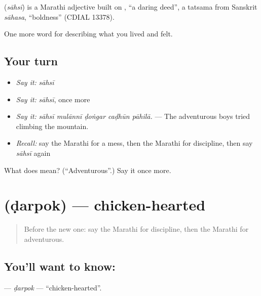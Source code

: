 \begin{cousinweb}
\textbf{} (\emph{sāhsī}) is a Marathi adjective built on , \textquotedblleft{}a daring deed\textquotedblright{}, a tatsama from Sanskrit \emph{sāhasa}, \textquotedblleft{}boldness\textquotedblright{} (CDIAL 13378).
\end{cousinweb}

\begin{grammarlens}[title={What you've built}]
One more word for describing what you lived and felt.
\end{grammarlens}

\subsection*{Your turn}
\begin{itemize}
\raggedright
  \item \emph{Say it:} \emph{sāhsī}
  \item \emph{Say it:} \emph{sāhsī}, once more
  \item \emph{Say it:} \emph{sāhsī mulānnī ḍoṅgar caḍhūn pāhilā.} — The adventurous boys tried climbing the mountain.
  \item \emph{Recall:} say the Marathi for a mess, then the Marathi for discipline, then say \emph{sāhsī} again
\end{itemize}

\begin{tcolorbox}[breakable,colback=teal!4,colframe=teal!35!black,title={Before you move on}]
What does  mean? (\textquotedblleft{}Adventurous\textquotedblright{}.) Say it once more.
\end{tcolorbox}
\section[\texorpdfstring{\mr{डरपोक} (ḍarpok)}{डरपोक (ḍarpok)}]{ (ḍarpok) — chicken-hearted}

\label{lesson:MR-C475-darpok}



\begin{quote}
Before the new one: say the Marathi for discipline, then the Marathi for adventurous.
\end{quote}

\subsection*{You'll want to know: }
\textbf{} — \emph{ḍarpok} — \textquotedblleft{}chicken-hearted\textquotedblright{}.

